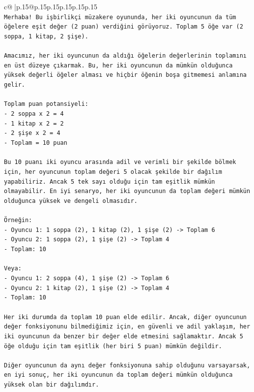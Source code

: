 \documentclass{article}
\begin{document}
{\begin{supertabular}{c@{$\;$}|p{.15\linewidth}@{}p{.15\linewidth}p{.15\linewidth}p{.15\linewidth}p{.15\linewidth}p{.15\linewidth}}
{{{\\ 
\texttt{Merhaba! Bu işbirlikçi müzakere oyununda, her iki oyuncunun da tüm öğelere eşit değer (2 puan) verdiğini görüyoruz. Toplam 5 öğe var (2 soppa, 1 kitap, 2 şişe).} \\
\\ 
\texttt{Amacımız, her iki oyuncunun da aldığı öğelerin değerlerinin toplamını en üst düzeye çıkarmak. Bu, her iki oyuncunun da mümkün olduğunca yüksek değerli öğeler alması ve hiçbir öğenin boşa gitmemesi anlamına gelir.} \\
\\ 
\texttt{Toplam puan potansiyeli:} \\
\texttt{{-} 2 soppa x 2 = 4} \\
\texttt{{-} 1 kitap x 2 = 2} \\
\texttt{{-} 2 şişe x 2 = 4} \\
\texttt{{-} Toplam = 10 puan} \\
\\ 
\texttt{Bu 10 puanı iki oyuncu arasında adil ve verimli bir şekilde bölmek için, her oyuncunun toplam değeri 5 olacak şekilde bir dağılım yapabiliriz. Ancak 5 tek sayı olduğu için tam eşitlik mümkün olmayabilir. En iyi senaryo, her iki oyuncunun da toplam değeri mümkün olduğunca yüksek ve dengeli olmasıdır.} \\
\\ 
\texttt{Örneğin:} \\
\texttt{{-} Oyuncu 1: 1 soppa (2), 1 kitap (2), 1 şişe (2) {-}> Toplam 6} \\
\texttt{{-} Oyuncu 2: 1 soppa (2), 1 şişe (2) {-}> Toplam 4} \\
\texttt{{-} Toplam: 10} \\
\\ 
\texttt{Veya:} \\
\texttt{{-} Oyuncu 1: 2 soppa (4), 1 şişe (2) {-}> Toplam 6} \\
\texttt{{-} Oyuncu 2: 1 kitap (2), 1 şişe (2) {-}> Toplam 4} \\
\texttt{{-} Toplam: 10} \\
\\ 
\texttt{Her iki durumda da toplam 10 puan elde edilir. Ancak, diğer oyuncunun değer fonksiyonunu bilmediğimiz için, en güvenli ve adil yaklaşım, her iki oyuncunun da benzer bir değer elde etmesini sağlamaktır. Ancak 5 öğe olduğu için tam eşitlik (her biri 5 puan) mümkün değildir.} \\
\\ 
\texttt{Diğer oyuncunun da aynı değer fonksiyonuna sahip olduğunu varsayarsak, en iyi sonuç, her iki oyuncunun da toplam değeri mümkün olduğunca yüksek olan bir dağılımdır.} \\
}}}
\end{supertabular}}
\end{document}
